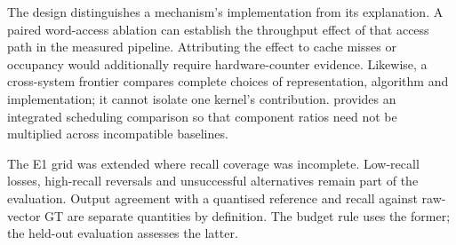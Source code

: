 The design distinguishes a mechanism's implementation from its explanation.
A paired word-access ablation can establish the throughput effect of that
access path in the measured pipeline. Attributing the effect to cache misses
or occupancy would additionally require hardware-counter evidence. Likewise,
a cross-system frontier compares complete choices of representation,
algorithm and implementation; it cannot isolate one kernel's contribution.
 provides an integrated scheduling comparison so that component
ratios need not be multiplied across incompatible baselines.

The E1 grid was extended where recall coverage was incomplete. Low-recall losses, high-recall
reversals and unsuccessful alternatives remain part of the evaluation.
Output agreement with a quantised reference and recall against raw-vector
GT are separate quantities by definition. The budget rule uses the former;
the held-out evaluation assesses the latter.
